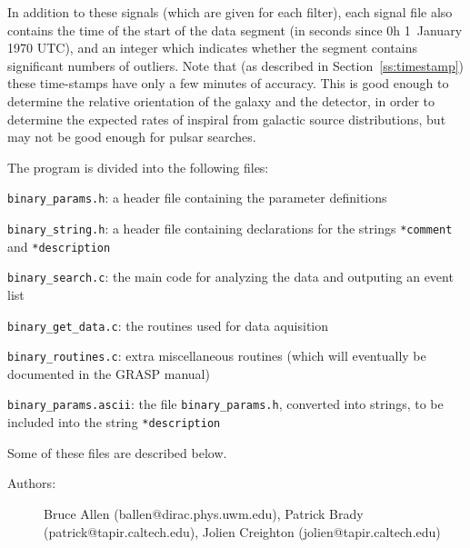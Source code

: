 In addition to these signals (which are given for each filter), each signal
file also contains the time of the start of the data segment (in seconds since
0h 1~January 1970 UTC), and an integer which indicates whether the segment
contains significant numbers of outliers.  Note that (as described in
Section~\ref{ss:timestamp}) these time-stamps have only a few minutes
of accuracy.  This is good enough to determine the relative
orientation of the galaxy and the detector, in order to determine the
expected rates of inspiral from galactic source distributions, but may
not be good enough for pulsar searches.

The program is divided into the following files:
\begin{description}
\item{\texttt{binary\_params.h}}: a header file containing the parameter
  definitions
\item{\texttt{binary\_string.h}}: a header file containing declarations for
  the strings \texttt{*comment} and \texttt{*description}
\item{\texttt{binary\_search.c}}: the main code for analyzing the data and
  outputing an event list
\item{\texttt{binary\_get\_data.c}}: the routines used for data aquisition
\item{\texttt{binary\_routines.c}}: extra miscellaneous routines (which will
  eventually be documented in the GRASP manual)
\item{\texttt{binary\_params.ascii}}: the file \texttt{binary\_params.h},
  converted into strings, to be included into the string \texttt{*description}
\end{description}
Some of these files are described below.

\begin{description}
\item[Authors:]  Bruce Allen (ballen@dirac.phys.uwm.edu), Patrick Brady
  (patrick@tapir.caltech.edu), Jolien Creighton (jolien@tapir.caltech.edu)
\end{description}
\clearpage

